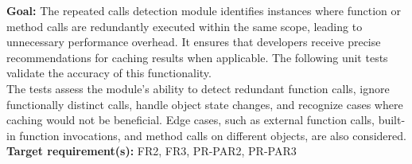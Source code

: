 \documentclass[12pt, titlepage]{article}
\begin{document}
  \textbf{Goal:} The repeated calls detection module identifies
  instances where function or method calls are redundantly executed
  within the same scope, leading to unnecessary performance overhead.
  It ensures that developers receive precise recommendations for
  caching results when applicable. The following unit tests validate
  the accuracy of this functionality.\\

  \noindent The tests assess the module’s ability to detect redundant
  function calls, ignore functionally distinct calls, handle object
  state changes, and recognize cases where caching would not be
  beneficial. Edge cases, such as external function calls, built-in
  function invocations, and method calls on different objects, are
  also considered. \\

  \noindent \textbf{Target requirement(s):} FR2, FR3, PR-PAR2,
  PR-PAR3~\cite{SRS} \\
\end{document}
